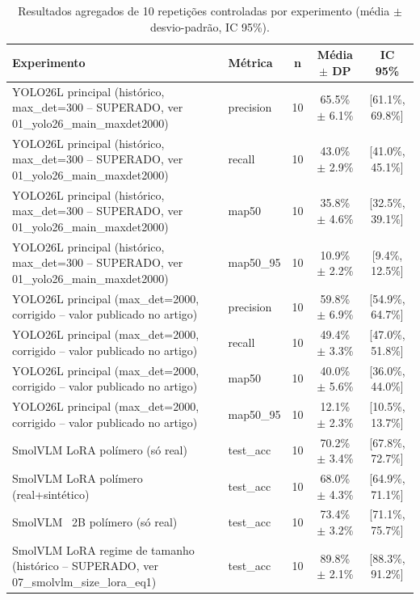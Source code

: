 \begin{table}[H]
    \centering
    \caption{Resultados agregados de 10 repetições controladas por experimento (média $\pm$ desvio-padrão, IC 95\%).}
    \label{tab:controlled_repetitions}
    \begin{tabular}{llccc}
        \hline
        \textbf{Experimento} & \textbf{Métrica} & \textbf{n} & \textbf{Média} $\pm$ \textbf{DP} & \textbf{IC 95\%} \\
        \hline
        YOLO26L principal (histórico, max_det=300 -- SUPERADO, ver 01_yolo26_main_maxdet2000) & precision & 10 & 65.5\% $\pm$ 6.1\% & [61.1\%, 69.8\%] \\
        YOLO26L principal (histórico, max_det=300 -- SUPERADO, ver 01_yolo26_main_maxdet2000) & recall & 10 & 43.0\% $\pm$ 2.9\% & [41.0\%, 45.1\%] \\
        YOLO26L principal (histórico, max_det=300 -- SUPERADO, ver 01_yolo26_main_maxdet2000) & map50 & 10 & 35.8\% $\pm$ 4.6\% & [32.5\%, 39.1\%] \\
        YOLO26L principal (histórico, max_det=300 -- SUPERADO, ver 01_yolo26_main_maxdet2000) & map50_95 & 10 & 10.9\% $\pm$ 2.2\% & [9.4\%, 12.5\%] \\
        YOLO26L principal (max_det=2000, corrigido -- valor publicado no artigo) & precision & 10 & 59.8\% $\pm$ 6.9\% & [54.9\%, 64.7\%] \\
        YOLO26L principal (max_det=2000, corrigido -- valor publicado no artigo) & recall & 10 & 49.4\% $\pm$ 3.3\% & [47.0\%, 51.8\%] \\
        YOLO26L principal (max_det=2000, corrigido -- valor publicado no artigo) & map50 & 10 & 40.0\% $\pm$ 5.6\% & [36.0\%, 44.0\%] \\
        YOLO26L principal (max_det=2000, corrigido -- valor publicado no artigo) & map50_95 & 10 & 12.1\% $\pm$ 2.3\% & [10.5\%, 13.7\%] \\
        SmolVLM LoRA polímero (só real) & test_acc & 10 & 70.2\% $\pm$ 3.4\% & [67.8\%, 72.7\%] \\
        SmolVLM LoRA polímero (real+sintético) & test_acc & 10 & 68.0\% $\pm$ 4.3\% & [64.9\%, 71.1\%] \\
        SmolVLM ~2B polímero (só real) & test_acc & 10 & 73.4\% $\pm$ 3.2\% & [71.1\%, 75.7\%] \\
        SmolVLM LoRA regime de tamanho (histórico -- SUPERADO, ver 07_smolvlm_size_lora_eq1) & test_acc & 10 & 89.8\% $\pm$ 2.1\% & [88.3\%, 91.2\%] \\

\end{tabular}
\end{table}
